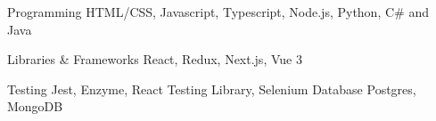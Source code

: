 



  




\begin{cvskills}

    \vspace{0.2cm}
  \cvskill
    {Programming} %
    {HTML/CSS, Javascript, Typescript, Node.js, Python, C\# and Java} %
    {}
    {}
    \vspace{0.2cm}
  
  \cvskill
    {Libraries \& Frameworks}
    {React, Redux, Next.js, Vue 3}
    {}
    {}
    \vspace{0.2cm}
  
  \cvskill
    {Testing}
    {Jest, Enzyme, React Testing Library, Selenium}
    {}
    {}
    \vspace{0.2cm}
  \cvskill
    {Database}
    {Postgres, MongoDB}
    {}
    {}


\end{cvskills}



